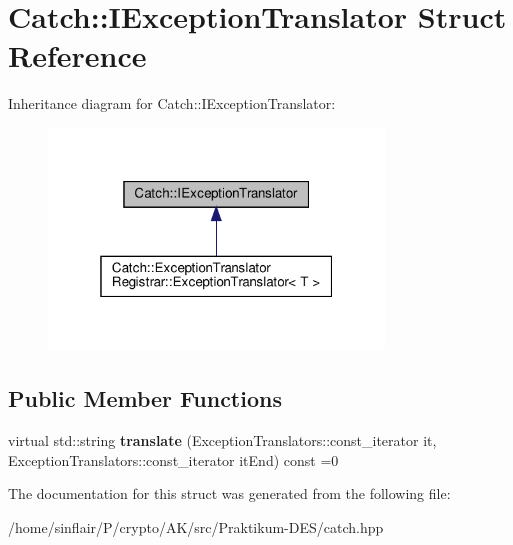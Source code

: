 \hypertarget{structCatch_1_1IExceptionTranslator}{}\section{Catch\+:\+:I\+Exception\+Translator Struct Reference}
\label{structCatch_1_1IExceptionTranslator}


Inheritance diagram for Catch\+:\+:I\+Exception\+Translator\+:
\nopagebreak
\begin{figure}[H]
\begin{center}
\leavevmode
\includegraphics[width=253pt]{structCatch_1_1IExceptionTranslator__inherit__graph}
\end{center}
\end{figure}
\subsection*{Public Member Functions}
\begin{DoxyCompactItemize}
\item 
\mbox{\label{structCatch_1_1IExceptionTranslator_a2a554b96ed5ed411e7c796b6b42837a5}} 
virtual std\+::string {\bfseries translate} (Exception\+Translators\+::const\+\_\+iterator it, Exception\+Translators\+::const\+\_\+iterator it\+End) const =0
\end{DoxyCompactItemize}


The documentation for this struct was generated from the following file\+:\begin{DoxyCompactItemize}
\item 
/home/sinflair/\+P/crypto/\+A\+K/src/\+Praktikum-\/\+D\+E\+S/catch.\+hpp\end{DoxyCompactItemize}
